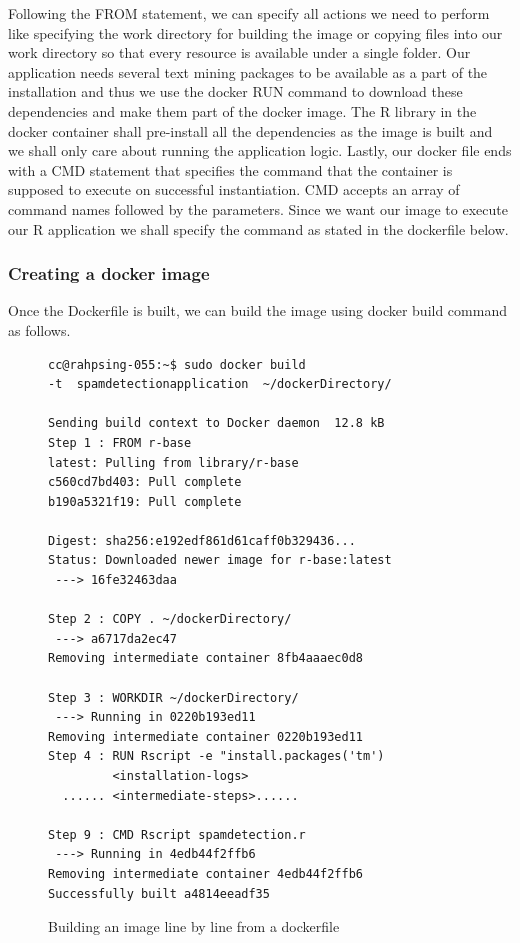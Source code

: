 \documentclass[9pt,twocolumn,twoside]{../../styles/osajnl}
\begin{document}
Following the FROM statement, we can specify all actions we need to
perform like specifying the work directory for building the image or
copying files into our work directory so that every resource is
available under a single folder. Our application needs several text
mining packages to be available as a part of the installation and thus
we use the docker RUN command to download these dependencies and make
them part of the docker image. The R library in the docker container
shall pre-install all the dependencies as the image is built and we
shall only care about running the application logic. Lastly, our
docker file ends with a CMD statement that specifies the command that
the container is supposed to execute on successful instantiation. CMD
accepts an array of command names followed by the parameters. Since we
want our image to execute our R application we shall specify the command
as stated in the dockerfile below.

\subsubsection{Creating a docker image}
Once the Dockerfile is built, we can build the image using docker
build command as follows.
\begin{figure}[H]
\begin{verbatim}
cc@rahpsing-055:~$ sudo docker build 
-t  spamdetectionapplication  ~/dockerDirectory/

Sending build context to Docker daemon  12.8 kB
Step 1 : FROM r-base
latest: Pulling from library/r-base
c560cd7bd403: Pull complete 
b190a5321f19: Pull complete 

Digest: sha256:e192edf861d61caff0b329436...
Status: Downloaded newer image for r-base:latest
 ---> 16fe32463daa

Step 2 : COPY . ~/dockerDirectory/
 ---> a6717da2ec47
Removing intermediate container 8fb4aaaec0d8

Step 3 : WORKDIR ~/dockerDirectory/
 ---> Running in 0220b193ed11
Removing intermediate container 0220b193ed11
Step 4 : RUN Rscript -e "install.packages('tm')
         <installation-logs>
  ...... <intermediate-steps>......

Step 9 : CMD Rscript spamdetection.r
 ---> Running in 4edb44f2ffb6
Removing intermediate container 4edb44f2ffb6
Successfully built a4814eeadf35
\end{verbatim}
\caption{Building an image line by line from a dockerfile}
\label{Building an image from a dockerfile}
\end{figure}
\end{document}
